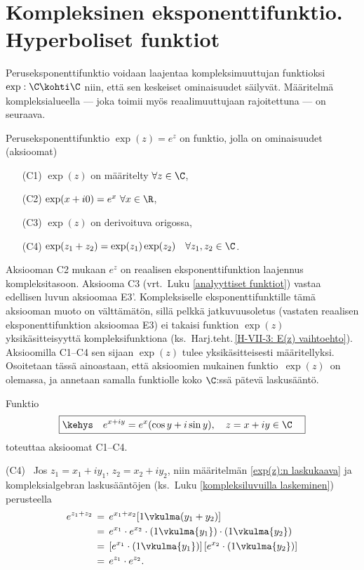 \section{Kompleksinen eksponenttifunktio. \\ Hyperboliset funktiot} 
\label{kompleksinen eksponenttifunktio}
\alku
{}

Peruseksponenttifunktio voidaan laajentaa kompleksimuuttujan funktioksi $\exp: \C\kohti\C$
niin, että sen keskeiset ominaisuudet säilyvät. Määritelmä kompleksialueella --- joka toimii
myös reaalimuuttujaan rajoitettuna --- on seuraava.
\begin{Def} 
Peruseksponenttifunktio $\exp (z)=e^z$ on funktio, jolla on ominaisuudet (aksioomat)
\begin{itemize}
\item[(C1)] $\exp (z)$ on määritelty $\forall z\in\C$,
\item[(C2)] $\exp(x+i0)=e^x\ \forall x\in\R$,
\item[(C3)] $\exp(z)$ on derivoituva origossa,
\item[(C4)] $\exp (z_1+z_2)=\exp(z_1)\exp(z_2)\quad\forall z_1,z_2\in\C$.
\end{itemize}
\end{Def}
Aksiooman C2 mukaan $e^z$ on reaalisen eksponenttifunktion laajennus kompleksitasoon.
Aksiooma C3 (vrt.\ Luku \ref{analyyttiset funktiot}) vastaa edellisen luvun aksioomaa E3'.
Kompleksiselle eksponenttifunktille tämä aksiooman muoto on välttämätön, sillä pelkkä
jatkuvuusoletus (vastaten reaalisen eksponenttifunktion aksioomaa E3) ei takaisi funktion
$\exp(z)$ yksikäsitteisyyttä kompleksifunktiona
(ks.\ Harj.teht.\,\ref{H-VII-3: E(z) vaihtoehto}). Aksioomilla C1--C4 sen sijaan $\exp(z)$
tulee yksikäsitteisesti määritellyksi. Osoitetaan tässä ainoastaan, että aksioomien
mukainen funktio $\,\exp(z)\,$ on olemassa, ja annetaan samalla funktiolle koko $\C$:ssä
pätevä laskusääntö.
\begin{Lause} \label{funktio exp(z)}
Funktio
\begin{equation} \label{exp(z):n laskukaava}
\boxed{\kehys\quad e^{x+iy}=e^x(\cos y+i\sin y),\quad z=x+iy\in\C \quad}
\end{equation}
toteuttaa aksioomat C1--C4.
\end{Lause}
\tod (C4) \  Jos $z_1=x_1+iy_1$, $z_2=x_2+iy_2$, niin määritelmän \eqref{exp(z):n laskukaava} 
ja kompleksialgebran laskusääntöjen (ks.\ Luku \ref{kompleksiluvuilla laskeminen})
perusteella 
\begin{align*}
e^{z_1+z_2} &\,=\, e^{x_1+x_2}[1\vkulma(y_1+y_2)] \\
           &\,=\, e^{x_1}\cdot e^{x_2}\cdot (1\vkulma{y_1})\cdot (1\vkulma{y_2}) \\
           &\,=\, [e^{x_1}\cdot (1\vkulma{y_1})]\,[e^{x_2}\cdot (1\vkulma{y_2})] \\
           &\,=\, e^{z_1}\cdot e^{z_2}.
\end{align*}

